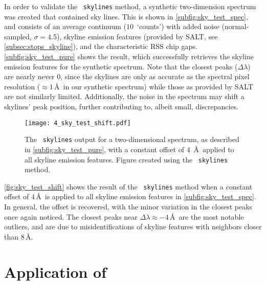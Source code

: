 In order to validate the \stops\ \texttt{skylines} method, a synthetic two-dimension spectrum was created that contained sky lines.
This is shown in \autoref{subfig:sky_test_spec}, and consists of an average continuum ($10$~`counts') with added noise (normal-sampled, $\sigma = 4.5$), skyline emission features (provided by \gls{SALT}, see \autoref{subsec:stops_skyline}), and the characteristic \gls{RSS} chip gaps.
\autoref{subfig:sky_test_pure} shows the result, which successfully retrieves the skyline emission features for the synthetic spectrum.
Note that the closest peaks ($\Delta \lambda$) are nearly never $0$, since the skylines are only as accurate as the spectral pixel resolution ($\approx 1$\,\AA\ in our synthetic spectrum) while those as provided by \gls{SALT} are not similarly limited.
Additionally, the noise in the spectrum may shift a skylines' peak position, further contributing to, albeit small, discrepancies.

\begin{figure}[t]
    \centering
    \texttt{[image: 4\_sky\_test\_shift.pdf]}
    \caption{
        The \stops\ \texttt{skylines} output for a two-dimensional spectrum, as described in \autoref{subfig:sky_test_pure}, with a constant offset of $4$~\AA\ applied to all skyline emission features.
        Figure created using the \stops\ \texttt{skylines} method.
    }
    \label{fig:sky_test_shift}
\end{figure}

\autoref{fig:sky_test_shift} shows the result of the \stops\ \texttt{skylines} method when a constant offset of $4$\,\AA\ is applied to all skyline emission features in \autoref{subfig:sky_test_spec}.
In general, the offset is recovered, with the minor variation in the closest peaks once again noticed.
The closest peaks near $\Delta \lambda \approx -4$\,\AA\ are the most notable outliers, and are due to misidentifications of skyline features with neighbors closer than $8$\,\AA.

\section[Application of \textsc{stops}]{Application of \stops} \label{sec:app_stops}

